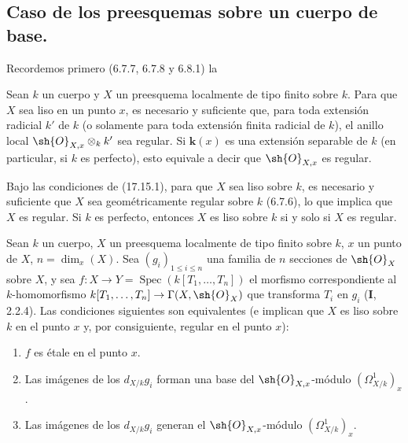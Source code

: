 \subsection{Caso de los preesquemas sobre un cuerpo de base.}
\label{subsection:IV.17.15}

Recordemos primero (6.7.7, 6.7.8 y 6.8.1) la

\begin{proposition}[17.15.1]
\label{IV.17.15.1}
Sean $k$ un cuerpo y $X$ un preesquema localmente de tipo finito sobre $k$. Para que $X$ sea liso en un punto $x$, es necesario y suficiente que, para toda extensión radicial $k'$ de $k$ \textup{(o solamente para toda extensión} finita radicial \textup{de} $k$\textup{)}, el anillo local $\sh{O}_{X,x}\otimes_k k'$ sea regular. Si $\boldsymbol k(x)$ es una extensión separable de $k$ \textup{(en particular, si} $k$ \textup{es} perfecto\textup{)}, esto equivale a decir que $\sh{O}_{X,x}$ es regular.
\end{proposition}

\begin{corollary}[17.15.2]
\label{IV.17.15.2}
Bajo las condiciones de \textup{(17.15.1)}, para que $X$ sea liso sobre $k$, es necesario y suficiente que $X$ sea geométricamente regular sobre $k$ \textup{(6.7.6)}, lo que implica que $X$ es regular. Si $k$ es perfecto, entonces $X$ es liso sobre $k$ si y solo si $X$ es regular.
\end{corollary}

\begin{proposition}[17.15.3]
\label{IV.17.15.3}
Sean $k$ un cuerpo, $X$ un preesquema localmente de tipo finito sobre $k$, $x$ un punto de $X$, $n=\dim_x(X)$. Sea $(g_i)_{1\leq i\leq n}$ una familia de $n$ secciones de $\sh{O}_X$ sobre $X$, y sea $f:X\to Y=\operatorname{Spec}(k[T_1,\ldots,T_n])$ el morfismo correspondiente al $k$-homomorfismo $k[T_1,\ldots,T_n]\to\Gamma(X,\sh{O}_X)$ que transforma $T_i$ en $g_i$ \textup{(\textbf I, 2.2.4)}. Las condiciones siguientes son equivalentes (e implican que $X$ es liso sobre $k$ en el punto $x$ \textup{y, por consiguiente,} regular \textup{en el punto} $x$):
\begin{enumerate}
  \item[\textup{a)}] $f$ es étale en el punto $x$.
  \item[\textup{b)}] Las imágenes de los $d_{X/k}g_i$ forman una base del $\sh{O}_{X,x}$-módulo $(\varOmega^1_{X/k})_x$.
  \item[\textup{c)}] Las imágenes de los $d_{X/k}g_i$ generan el $\sh{O}_{X,x}$-módulo $(\varOmega^1_{X/k})_x$.
\end{enumerate}
\end{proposition}


